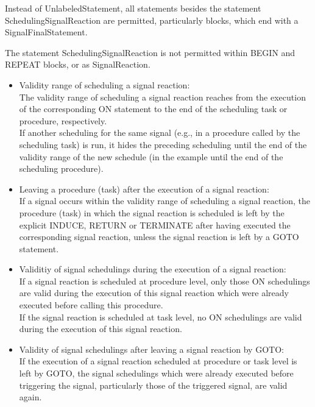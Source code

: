 





Instead of UnlabeledStatement, all statements besides the
statement SchedulingSignalReaction are permitted, particularly
blocks,  which  end with a SignalFinalStatement.

The statement SchedulingSignalReaction is not permitted within BEGIN
and REPEAT blocks, or as SignalReaction.

\begin{itemize}
\item Validity range of scheduling a signal reaction:\\
The validity range of scheduling a signal reaction reaches from the
execution of the corresponding ON statement to the end of the
scheduling task or procedure, respectively.\\
If another scheduling for the same signal (e.g., in a procedure called
by the scheduling task) is run, it hides the preceding scheduling until
the end of the validity range of the new schedule (in the example until
the end of the scheduling procedure).
\item Leaving a procedure (task) after the execution of a signal
reaction:\\
If a signal occurs within the validity range of scheduling a signal
reaction, the procedure (task) in which the signal reaction is scheduled
is left by 
the explicit INDUCE, RETURN or TERMINATE
 after having executed the 
corresponding signal reaction, unless the signal reaction is left by a 
GOTO statement.
\item Validitiy of signal schedulings during the execution of a signal
reaction:\\
If a signal reaction is scheduled at procedure level, only those ON
schedulings are valid during the execution of this signal reaction which
were already executed before calling this procedure.\\
If the signal reaction is scheduled at task level, no ON schedulings are
valid during the execution of this signal reaction.
\item Validity of signal schedulings after leaving a signal reaction by
GOTO:\\
If the execution of a signal reaction scheduled at procedure or task
level is left by GOTO, the signal schedulings which were already
executed before triggering the signal, particularly those of the
triggered signal, are valid again.
\end{itemize}

